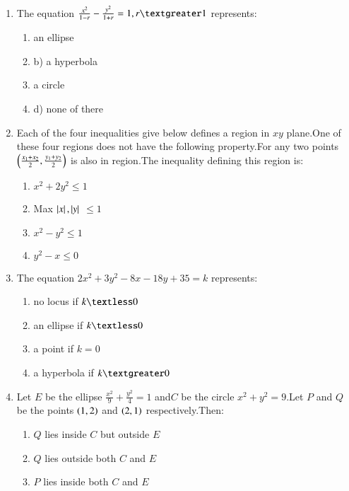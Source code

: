 \documentclass[journal,12pt,twocolumn]{IEEEtran}
\theoremstyle{remark}
\begin{document}
\begin{enumerate}

    \item The equation $\frac{x^2}{1-r}-\frac{y^2}{1+r}=1,r\textgreater1$
represents:\hfill  {}\\
\begin{enumerate}
    \item an ellipse    \item      b)   a hyperbola
   \item a circle     \item   d) none of there \\
\end{enumerate}
\item Each of the four inequalities give below defines a region in $xy$ plane.One of these four regions does not have the following property.For any two points   $\left(\frac{x_1+x_2}{2},\frac{y_1+y_2}{2}\right)$   is also in region.The inequality defining this region is:
\hfill {}\\
\begin{enumerate}
    \item $x^2+2y^2\le1$
    \item Max $\left\vert x\right\vert,\left\vert y\right\vert$ $\le1$
    \item $x^2-y^2\le1$
    \item $y^2-x\le0$\\ 
\end{enumerate}
\item The equation $2x^2+3y^2-8x-18y+35=k$ represents:
\hfill {}
\begin{enumerate}
    \item no locus if $k\textless0$
    \item an ellipse if $k\textless0$
    \item a point if $k=0$
    \item a hyperbola if $k\textgreater0$ \\
\end{enumerate}
\item Let $E$ be the ellipse $\frac{x^2}{9}+\frac{y^2}{4}=1$ and$C$ be the circle $x^2+y^2=9$.Let $P$ and $Q$ be the points $\left(1,2\right)$ and $\left(2,1\right)$ respectively.Then:\hfill {}
\begin{enumerate}
    \item $Q$ lies inside $C$ but outside $E$
    \item $Q$ lies outside both $C$ and $E$
    \item $P$ lies inside both $C$ and $E$

\end{enumerate}
\end{enumerate}
\end{document}
